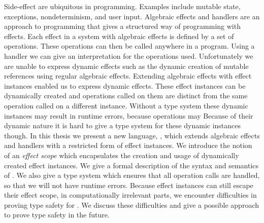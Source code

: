 Side-effect are ubiquitous in programming. Examples include mutable state, exceptions, nondeterminism, and user input.
Algebraic effects and handlers are an approach to programming that gives a structured way of programming with effects.
Each effect in a system with algebraic effects is defined by a set of operations.
These operations can then be called anywhere in a program.
Using a handler we can give an interpretation for the operations used.
Unfortunately we are unable to express dynamic effects such as the dynamic creation of mutable references using regular algebraic effects.
Extending algebraic effects with effect instances enabled us to express dynamic effects.
These effect instances can be dynamically created and operations called on them are distinct from the same operation called on a different instance.
Without a type system these dynamic instances may result in runtime errors, because operations may
Because of their dynamic nature it is hard to give a type system for these dynamic instances though.
In this thesis we present a new language, \lang{}, which extends algebraic effects and handlers with a restricted form of effect instances.
We introduce the notion of an \emph{effect scope} which encapsulates the creation and usage of dynamically created effect instances. We give a formal description of the syntax and semantics of \lang{}.
We also give a type system which ensures that all operation calls are handled, so that we will not have runtime errors.
Because effect instances can still escape their effect scope, in computationally irrelevant parts, we encounter difficulties in proving type safety for \lang{}. We discuss these difficulties and give a possible approach to prove type safety in the future.
